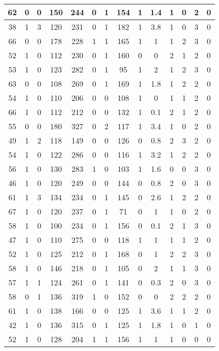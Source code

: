 \documentclass{article}
\begin{document}
\begin{longtable}{|c|c|c|c|c|c|c|c|c|c|c|c|c|c|}
62 & 0 & 0 & 150 & 244 & 0 & 1 & 154 & 1 & 1.4 & 1 & 0 & 2 & 0 \\ \hline
38 & 1 & 3 & 120 & 231 & 0 & 1 & 182 & 1 & 3.8 & 1 & 0 & 3 & 0 \\ \hline
66 & 0 & 0 & 178 & 228 & 1 & 1 & 165 & 1 & 1 & 1 & 2 & 3 & 0 \\ \hline
52 & 1 & 0 & 112 & 230 & 0 & 1 & 160 & 0 & 0 & 2 & 1 & 2 & 0 \\ \hline
53 & 1 & 0 & 123 & 282 & 0 & 1 & 95 & 1 & 2 & 1 & 2 & 3 & 0 \\ \hline
63 & 0 & 0 & 108 & 269 & 0 & 1 & 169 & 1 & 1.8 & 1 & 2 & 2 & 0 \\ \hline
54 & 1 & 0 & 110 & 206 & 0 & 0 & 108 & 1 & 0 & 1 & 1 & 2 & 0 \\ \hline
66 & 1 & 0 & 112 & 212 & 0 & 0 & 132 & 1 & 0.1 & 2 & 1 & 2 & 0 \\ \hline
55 & 0 & 0 & 180 & 327 & 0 & 2 & 117 & 1 & 3.4 & 1 & 0 & 2 & 0 \\ \hline
49 & 1 & 2 & 118 & 149 & 0 & 0 & 126 & 0 & 0.8 & 2 & 3 & 2 & 0 \\ \hline
54 & 1 & 0 & 122 & 286 & 0 & 0 & 116 & 1 & 3.2 & 1 & 2 & 2 & 0 \\ \hline
56 & 1 & 0 & 130 & 283 & 1 & 0 & 103 & 1 & 1.6 & 0 & 0 & 3 & 0 \\ \hline
46 & 1 & 0 & 120 & 249 & 0 & 0 & 144 & 0 & 0.8 & 2 & 0 & 3 & 0 \\ \hline
61 & 1 & 3 & 134 & 234 & 0 & 1 & 145 & 0 & 2.6 & 1 & 2 & 2 & 0 \\ \hline
67 & 1 & 0 & 120 & 237 & 0 & 1 & 71 & 0 & 1 & 1 & 0 & 2 & 0 \\ \hline
58 & 1 & 0 & 100 & 234 & 0 & 1 & 156 & 0 & 0.1 & 2 & 1 & 3 & 0 \\ \hline
47 & 1 & 0 & 110 & 275 & 0 & 0 & 118 & 1 & 1 & 1 & 1 & 2 & 0 \\ \hline
52 & 1 & 0 & 125 & 212 & 0 & 1 & 168 & 0 & 1 & 2 & 2 & 3 & 0 \\ \hline
58 & 1 & 0 & 146 & 218 & 0 & 1 & 105 & 0 & 2 & 1 & 1 & 3 & 0 \\ \hline
57 & 1 & 1 & 124 & 261 & 0 & 1 & 141 & 0 & 0.3 & 2 & 0 & 3 & 0 \\ \hline
58 & 0 & 1 & 136 & 319 & 1 & 0 & 152 & 0 & 0 & 2 & 2 & 2 & 0 \\ \hline
61 & 1 & 0 & 138 & 166 & 0 & 0 & 125 & 1 & 3.6 & 1 & 1 & 2 & 0 \\ \hline
42 & 1 & 0 & 136 & 315 & 0 & 1 & 125 & 1 & 1.8 & 1 & 0 & 1 & 0 \\ \hline
52 & 1 & 0 & 128 & 204 & 1 & 1 & 156 & 1 & 1 & 1 & 0 & 0 & 0 \\ \hline

\end{longtable}
\end{document}
